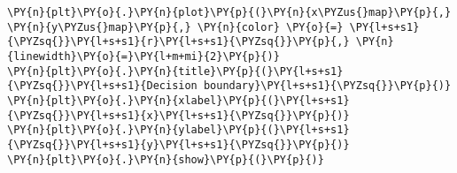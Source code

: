 \begin{tcolorbox}[breakable, size=fbox, boxrule=1pt, pad at break*=1mm,colback=cellbackground, colframe=cellborder]
\begin{Verbatim}[commandchars=\\\{\}]
\PY{n}{plt}\PY{o}{.}\PY{n}{plot}\PY{p}{(}\PY{n}{x\PYZus{}map}\PY{p}{,} \PY{n}{y\PYZus{}map}\PY{p}{,} \PY{n}{color} \PY{o}{=} \PY{l+s+s1}{\PYZsq{}}\PY{l+s+s1}{r}\PY{l+s+s1}{\PYZsq{}}\PY{p}{,} \PY{n}{linewidth}\PY{o}{=}\PY{l+m+mi}{2}\PY{p}{)}
\PY{n}{plt}\PY{o}{.}\PY{n}{title}\PY{p}{(}\PY{l+s+s1}{\PYZsq{}}\PY{l+s+s1}{Decision boundary}\PY{l+s+s1}{\PYZsq{}}\PY{p}{)}
\PY{n}{plt}\PY{o}{.}\PY{n}{xlabel}\PY{p}{(}\PY{l+s+s1}{\PYZsq{}}\PY{l+s+s1}{x}\PY{l+s+s1}{\PYZsq{}}\PY{p}{)}
\PY{n}{plt}\PY{o}{.}\PY{n}{ylabel}\PY{p}{(}\PY{l+s+s1}{\PYZsq{}}\PY{l+s+s1}{y}\PY{l+s+s1}{\PYZsq{}}\PY{p}{)}
\PY{n}{plt}\PY{o}{.}\PY{n}{show}\PY{p}{(}\PY{p}{)}
\end{Verbatim}
\end{tcolorbox}

    \begin{center}
    \end{center}
    { \hspace*{\fill} \\}
    
